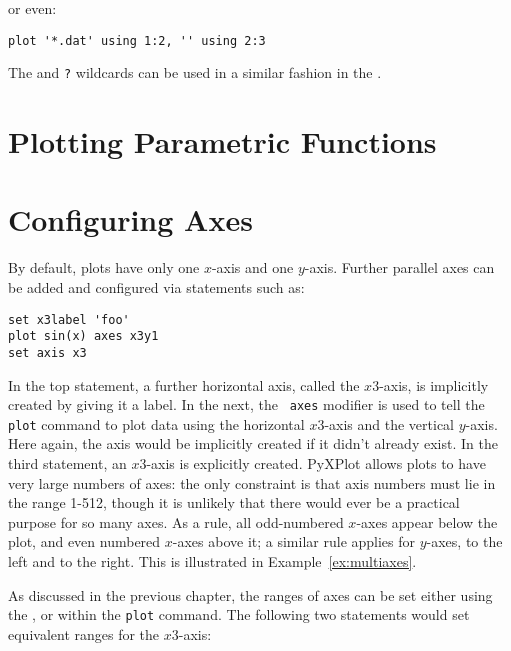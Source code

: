 \noindent or even:

\begin{verbatim}
plot '*.dat' using 1:2, '' using 2:3
\end{verbatim}

The {\tt *} and {\tt ?} wildcards can be used in a similar fashion in the
.

\section{Plotting Parametric Functions}

\section{Configuring Axes}
\label{sec:multiple_axes}

By default, plots have only one $x$-axis and one $y$-axis. Further parallel
axes can be added and configured via statements such as:

\begin{verbatim}
set x3label 'foo'
plot sin(x) axes x3y1
set axis x3
\end{verbatim}

\noindent In the top statement, a further horizontal axis, called the
$x3$-axis, is implicitly created by giving it a label. In the next, the {\tt
axes} modifier is used to tell the {\tt plot} command to plot data using the
horizontal $x3$-axis and the vertical $y$-axis. Here again, the axis would be
implicitly created if it didn't already exist.  In the third statement, an
$x3$-axis is explicitly created.  PyXPlot allows plots to have very large
numbers of axes: the only constraint is that axis numbers must lie in the range
1-512, though it is unlikely that there would ever be a practical purpose for
so many axes.  As a rule, all odd-numbered $x$-axes appear below the plot, and
even numbered $x$-axes above it; a similar rule applies for $y$-axes, to the
left and to the right.  This is illustrated in Example~\ref{ex:multiaxes}.


As discussed in the previous chapter, the ranges of axes can be set either
using the , or within the {\tt plot} command. The following
two statements would set equivalent ranges for the $x3$-axis:

